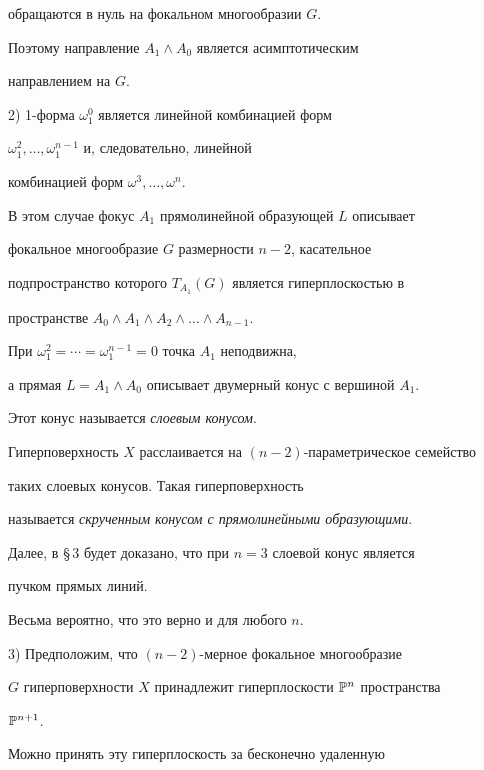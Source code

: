 обращаются в нуль на фокальном многообразии $G$.


Поэтому направление $A_1 \wedge A_0$ является асимптотическим


направлением на $G$.







2) 1-форма $\omega_1^0$ является линейной комбинацией форм


$\omega_1^2, \dotsc, \omega_1^{n-1}$ и, следовательно, линейной


комбинацией форм  $\omega^3, \dotsc, \omega^n$.


В этом случае фокус $A_1$ прямолинейной образующей $L$ описывает


фокальное многообразие $G$ размерности $n - 2$, касательное


подпространство которого $T_{A_1} (G)$ является гиперплоскостью в


пространстве $A_0 \wedge A_1 \wedge A_2 \wedge \dotsc


\wedge A_{n-1}$.


При $\omega_1^2 = \dotsb = \omega_1^{n-1} = 0$ точка $A_1$ неподвижна,


а прямая  $L = A_1 \wedge A_0$ описывает двумерный конус с вершиной $A_1$.


Этот конус называется  {\em слоевым конусом}.


Гиперповерхность $X$ расслаивается на $(n-2)$-параметрическое семейство


таких слоевых конусов. Такая гиперповерхность


называется {\em скрученным конусом с прямолинейными образующими}.





Далее, в \S\,3 будет доказано, что при $n = 3$ слоевой конус является


пучком прямых линий.


Весьма вероятно, что это верно и для любого $n$.








3) Предположим, что $(n-2)$-мерное фокальное многообразие


$G$ гиперповерхности $X$ принадлежит гиперплоскости ${\Bbb P}^n$ пространства


${\Bbb P}^{n+1}$.


Можно принять эту гиперплоскость за бесконечно удаленную


